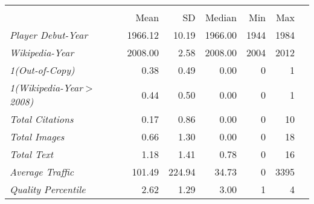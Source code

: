 {
\def\sym#1{\ifmmode^{#1}\else\(^{#1}\)\fi}
\begin{tabular*}{\hsize}{@{\hskip\tabcolsep\extracolsep\fill}l*{1}{rrrrrr}}
\toprule
                              &\multicolumn{5}{c}{}                                            \\
                              &        Mean&          SD&      Median&         Min&         Max\\
\midrule
\emph{Player Debut-Year}      &     1966.12&       10.19&     1966.00&        1944&        1984\\
\emph{Wikipedia-Year}         &     2008.00&        2.58&     2008.00&        2004&        2012\\
\emph{1(Out-of-Copy)}         &        0.38&        0.49&        0.00&           0&           1\\
\emph{1(Wikipedia-Year$>$2008)}&        0.44&        0.50&        0.00&           0&           1\\
\emph{Total Citations}        &        0.17&        0.86&        0.00&           0&          10\\
\emph{Total Images}           &        0.66&        1.30&        0.00&           0&          18\\
\emph{Total Text}             &        1.18&        1.41&        0.78&           0&          16\\
\emph{Average Traffic}        &      101.49&      224.94&       34.73&           0&        3395\\
\emph{Quality Percentile}     &        2.62&        1.29&        3.00&           1&           4\\
\bottomrule
\end{tabular*}
}
